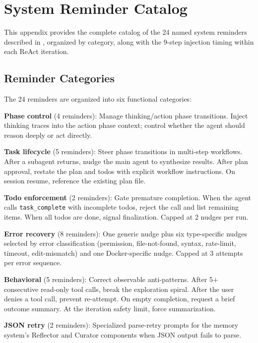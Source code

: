 
\section{System Reminder Catalog}
\label{app:reminders}

This appendix provides the complete catalog of the 24 named system reminders described in , organized by category, along with the 9-step injection timing within each ReAct iteration.

\subsection{Reminder Categories}
\label{app:reminder_categories}

The 24 reminders are organized into six functional categories:

\begin{packeditemize}
\item \textbf{Phase control} (4 reminders): Manage thinking/action phase transitions. Inject thinking traces into the action phase context; control whether the agent should reason deeply or act directly.

\item \textbf{Task lifecycle} (5 reminders): Steer phase transitions in multi-step workflows. After a subagent returns, nudge the main agent to synthesize results. After plan approval, restate the plan and todos with explicit workflow instructions. On session resume, reference the existing plan file.

\item \textbf{Todo enforcement} (2 reminders): Gate premature completion. When the agent calls \texttt{task\_complete} with incomplete todos, reject the call and list remaining items. When all todos are done, signal finalization. Capped at 2 nudges per run.

\item \textbf{Error recovery} (8 reminders): One generic nudge plus six type-specific nudges selected by error classification (permission, file-not-found, syntax, rate-limit, timeout, edit-mismatch) and one Docker-specific nudge. Capped at 3 attempts per error sequence.

\item \textbf{Behavioral} (5 reminders): Correct observable anti-patterns. After 5+ consecutive read-only tool calls, break the exploration spiral. After the user denies a tool call, prevent re-attempt. On empty completion, request a brief outcome summary. At the iteration safety limit, force summarization.

\item \textbf{JSON retry} (2 reminders): Specialized parse-retry prompts for the memory system's Reflector and Curator components when JSON output fails to parse.
\end{packeditemize}

